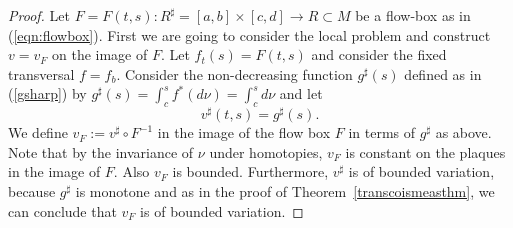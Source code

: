\documentclass{ip-journal}
\theoremstyle{definition}
\numberwithin{equation}{section}
\begin{document}
\begin{proof}

Let $F=F(t,s): R^\sharp=[a,b] \times [c,d]  \rightarrow  R \subset M$
be a flow-box as in (\ref{eqn:flowbox}). 
First we are going to consider the local problem 
and construct $v=v_F$ on the image  of $F$.
Let $f_t(s) = F(t,s)$ and consider the fixed transversal $f = f_b$.  
Consider the non-decreasing function $g^\sharp(s)$ defined as in (\ref{gsharp})
by
$g^\sharp(s) =\int_c^sf^*( d\nu)=
 \int_c^s d\nu $
and let
\begin{equation}\label{vsharp}
v^\sharp(t,s) = g^\sharp(s). 
\end{equation}
We define
$v_F:=v^\sharp \circ F^{-1}$ in the image of the flow box $F$ in terms of $g^\sharp$ as above. 
Note that by the invariance of $\nu$ under homotopies, $v_F$
is constant on the plaques in the image of $F$. Also
 $v_F$ is  bounded. Furthermore, $v^\sharp$ is of bounded variation, because $g^\sharp$ is monotone and  
 as in the proof of Theorem~\ref{transcoismeasthm}, we can conclude that $ v_F$ is of bounded variation.
 

\end{proof}
\end{document}
